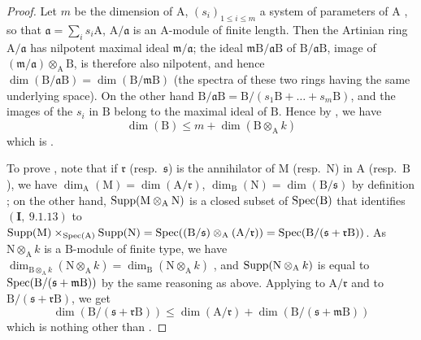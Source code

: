 \begin{proof}
Let $m$ be the dimension of $\mathrm{A}$, $(s_i)_{1\leq i\leq m}$ a system of parameters of $\mathrm{A}$ , so that $\mathfrak{a}=\sum_i s_i\mathrm{A}$, $\mathrm{A}/\mathfrak{a}$ is an $\mathrm{A}$-module of finite length.
Then the Artinian ring $\mathrm{A}/\mathfrak{a}$ has nilpotent maximal ideal $\mathfrak{m}/\mathfrak{a}$; the ideal $\mathfrak{m}\mathrm{B}/\mathfrak{a}\mathrm{B}$ of $\mathrm{B}/\mathfrak{a}\mathrm{B}$, image of $(\mathfrak{m}/\mathfrak{a})\otimes_\mathrm{A}\mathrm{B}$, is therefore also nilpotent, and hence $\dim(\mathrm{B}/\mathfrak{a}\mathrm{B})=\dim(\mathrm{B}/\mathfrak{m}\mathrm{B})$ (the spectra of these two rings having the same underlying space).
On the other hand $\mathrm{B}/\mathfrak{a}\mathrm{B}=\mathrm{B}/(s_1\mathrm{B}+\ldots+s_m\mathrm{B})$, and the images of the $s_i$ in $\mathrm{B}$ belong to the maximal ideal of $\mathrm{B}$.
Hence by , we have
\[
  \dim(\mathrm{B})\leq m+\dim(\mathrm{B}\otimes_\mathrm{A}k)
\]
which is .

To prove , note that if $\mathfrak{r}$ (resp.~$\mathfrak{s}$) is the annihilator of $\mathrm{M}$ (resp.~$\mathrm{N}$)  in $\mathrm{A}$ (resp.~$\mathrm{B}$), we have $\dim_\mathrm{A}(\mathrm{M})=\dim(\mathrm{A}/\mathfrak{r})$, $\dim_\mathrm{B}(\mathrm{N})=\dim(\mathrm{B}/\mathfrak{s})$ by definition ; on the other hand, $\operatorname{Supp}(\mathrm{M}\otimes_\mathrm{A}\mathrm{N})$ is a closed subset of $\operatorname{Spec}(\mathrm{B})$ that identifies $(\mathbf{I},~9.1.13)$ to $\operatorname{Supp}(\mathrm{M})\times_{\operatorname{Spec}(\mathrm{A})}\operatorname{Supp}(\mathrm{N})=\operatorname{Spec}((\mathrm{B}/\mathfrak{s})\otimes_\mathrm{A}(\mathrm{A}/\mathfrak{r}))=\operatorname{Spec}(\mathrm{B}/(\mathfrak{s}+\mathfrak{r}\mathrm{B}))$.
As $\mathrm{N}\otimes_\mathrm{A}k$ is a $\mathrm{B}$-module of finite type, we have $\dim_{\mathrm{B}\otimes_\mathrm{A}k}(\mathrm{N}\otimes_\mathrm{A}k)=\dim_\mathrm{B}(\mathrm{N}\otimes_\mathrm{A}k)$ , and $\operatorname{Supp}(\mathrm{N}\otimes_\mathrm{A}k)$ is equal to $\operatorname{Spec}(\mathrm{B}/(\mathfrak{s}+\mathfrak{m}\mathrm{B}))$ by the same reasoning as above.
Applying  to $\mathrm{A}/\mathfrak{r}$ and to $\mathrm{B}/(\mathfrak{s}+\mathfrak{r}\mathrm{B})$, we get
\[
  \dim(\mathrm{B}/(\mathfrak{s}+\mathfrak{r}\mathrm{B}))\leq\dim(\mathrm{A}/\mathfrak{r})+\dim(\mathrm{B}/(\mathfrak{s}+\mathfrak{m}\mathrm{B}))
\]
which is nothing other than .
\end{proof}

